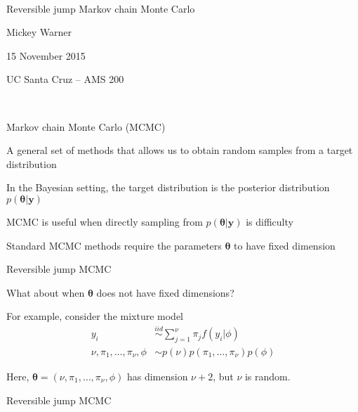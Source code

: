 \documentclass[mathserif, 12pt, t]{beamer}
\newcommand{\m}[1]{\mathbf{\bm{#1}}}
\renewcommand{\frametitle}[1]{\vspace{0.14cm}\hspace{-0.70cm}\textcolor{col2}{%
    \Large{#1}}\vspace{0.15cm}\newline}
\begin{document}
\begin{center}
\ \\ [-0.5in]
\vfill
\bigskip
\bigskip
\bigskip
\bigskip
\bigskip

\begin{Large}
\begin{center}
Reversible jump Markov chain Monte Carlo
\end{center}
\end{Large}
\vfill

Mickey Warner
\vfill

15 November 2015
\smallskip

UC Santa Cruz -- AMS 200

\bigskip
\bigskip
\vfill
\ \\ [-0.5in]
\end{center}



\begin{frame}
\frametitle{Markov chain Monte Carlo (MCMC)}

A general set of methods that allows us to obtain random samples from a target distribution
\bigskip

In the Bayesian setting, the target distribution is the posterior distribution $p(\m{\theta}|\m{y})$
\bigskip

MCMC is useful when directly sampling from $p(\m{\theta}|\m{y})$ is difficulty
\bigskip

Standard MCMC methods require the parameters $\m{\theta}$ to have fixed dimension


\end{frame}


\begin{frame}
\frametitle{Reversible jump MCMC}

What about when $\m{\theta}$ does not have fixed dimensions?
\bigskip

For example, consider the mixture model
\begin{align*}
y_i &\overset{iid}\sim \sum_{j=1}^\nu \pi_j f(y_i|\phi) \\
\nu,\pi_1,\ldots,\pi_\nu,\phi &\sim p(\nu)p(\pi_1,\ldots,\pi_\nu)p(\phi) 
\end{align*}

Here, $\m{\theta}=(\nu,\pi_1,\ldots,\pi_\nu,\phi)$ has dimension $\nu+2$, but $\nu$ is random.
\end{frame}


\begin{frame}
\frametitle{Reversible jump MCMC}

\end{frame}
\end{document}
